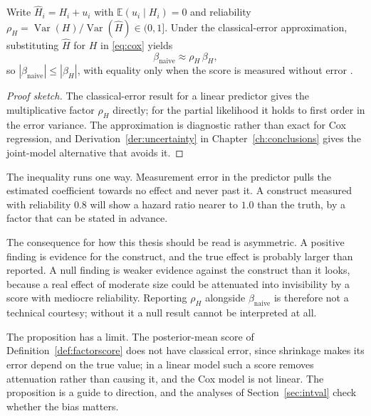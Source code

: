 \begin{proposition}
\label{prop:attenuation}
Write $\widehat H_i=H_i+u_i$ with $\mathbb E(u_i\mid H_i)=0$ and reliability
$\rho_H=\operatorname{Var}(H)/\operatorname{Var}(\widehat H)\in(0,1]$. Under
the classical-error approximation, substituting $\widehat H$ for $H$ in
\eqref{eq:cox} yields
\[
  \beta_{\mathrm{naive}}\approx\rho_H\,\beta_H,
\]
so $|\beta_{\mathrm{naive}}|\le|\beta_H|$, with equality only when the score is
measured without error \citep{prentice_1982}.
\end{proposition}

\begin{proof}[Proof sketch]
The classical-error result for a linear predictor gives the multiplicative
factor $\rho_H$ directly; for the partial likelihood it holds to first order in
the error variance. The approximation is diagnostic rather than exact for Cox
regression, and Derivation~\ref{der:uncertainty} in
Chapter~\ref{ch:conclusions} gives the joint-model alternative that avoids it.
\end{proof}

\begin{reading}
The inequality runs one way. Measurement error in the predictor pulls the
estimated coefficient towards no effect and never past it. A construct measured
with reliability $0.8$ will show a hazard ratio nearer to $1.0$ than the truth,
by a factor that can be stated in advance.

The consequence for how this thesis should be read is asymmetric. A positive
finding is evidence for the construct, and the true effect is probably larger
than reported. A null finding is weaker evidence against the construct than it
looks, because a real effect of moderate size could be attenuated into
invisibility by a score with mediocre reliability. Reporting $\rho_H$ alongside
$\beta_{\mathrm{naive}}$ is therefore not a technical courtesy; without it a
null result cannot be interpreted at all.
\end{reading}

The proposition has a limit. The posterior-mean score of Definition~\ref{def:factorscore} does not have classical error, since shrinkage makes its error depend on the true value; in a linear model such a score removes attenuation rather than causing it, and the Cox model is not linear. The proposition is a guide to direction, and the analyses of Section~\ref{sec:intval} check whether the bias matters.

